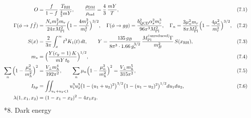 \documentclass[10pt,a4paper]{article}
\makeatletter
\renewcommand\section{\@startsection{section}{1}{\z@}{-3.5ex \@plus -1ex \@minus -.2ex}{2.3ex \@plus.2ex}{\normalfont\Large\bfseries\raggedright}}
\makeatother
\begin{document}
\begin{align*}
O&=\frac f{1-f}\,\frac{T_{\rm RH}}{\frac43mY},\qquad \frac{\rho_{\rm DM}}{\rho_{\rm rad}}=\frac43\,\frac{mY}{T},&&(7.1) \\
\Gamma(\phi\to f\bar f)&=\frac{N_cm_f^2m_r}{24\pi M_{\rm Pl}^2}\Big(1-\frac{4m_f^2}{m_r^2}\Big)^{3/2},\quad \Gamma(\phi\to gg)=\frac{b_{\rm QCD}^2\alpha_s^2m_r^3}{96\pi^3M_{\rm Pl}^2},\quad \Gamma_n=\frac{3\mu_n^2m_r}{8\pi M_{\rm Pl}^2}\Big(1-\frac{4\mu_n^2}{m_r^2}\Big)^{3/2},&&(7.2) \\
S(x)&=\frac2{3\pi}\int_x^\infty t^3K_1(t)\,dt,\qquad Y=\frac{135\,g_B}{8\pi^3\cdot1.66\,g_*^{3/2}}\,\frac{M_{\rm Pl}^{\rm (unreduced)}\Gamma}{m_B^2}\,S(x_{\rm RH}),&&(7.3) \\
m_*&=\Big(\frac{Y(c_y=1)\,K}{mY\,t_0}\Big)^{1/2},&&(7.4) \\
\sum_n\Big(1-\frac{\mu_n^2}{m_h^2}\Big)^2&=\frac{V_\perp m_h^4}{192\pi^2},\qquad \sum_n\mu_n\Big(1-\frac{\mu_n^2}{m_h^2}\Big)^2=\frac{V_\perp m_h^5}{315\pi^2},&&(7.5) \\
I_{hp}&=\iint_{u_1+u_2<1}u_1^3u_2^3\big(1-(u_1+u_2)^2\big)^{3/2}\big(1-(u_1-u_2)^2\big)^{1/2}du_1du_2,&&(7.6) \\
\lambda(1,x_1,x_2)&=(1-x_1-x_2)^2-4x_1x_2 .
\end{align*}
\section*{8. Dark energy}
\end{document}
